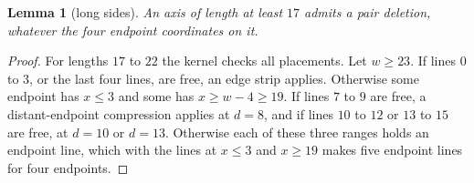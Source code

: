 \documentclass[11pt]{article}
\newtheorem{lemma}[theorem]{Lemma}
\begin{document}
\begin{lemma}[long sides]\label{lem:wide}
An axis of length at least $17$ admits a pair deletion, whatever the four endpoint coordinates on
it.
\end{lemma}
\begin{proof}
For lengths $17$ to $22$ the kernel checks all placements. Let $w\ge 23$. If lines $0$ to $3$, or
the last four lines, are free, an edge strip applies. Otherwise some endpoint has $x\le 3$ and some
has $x\ge w-4\ge 19$. If lines $7$ to $9$ are free, a distant-endpoint compression applies at
$d=8$, and if lines $10$ to $12$ or $13$ to $15$ are free, at $d=10$ or $d=13$. Otherwise each of
these three ranges holds an endpoint line, which with the lines at $x\le 3$ and $x\ge 19$ makes
five endpoint lines for four endpoints.
\end{proof}

\end{document}
